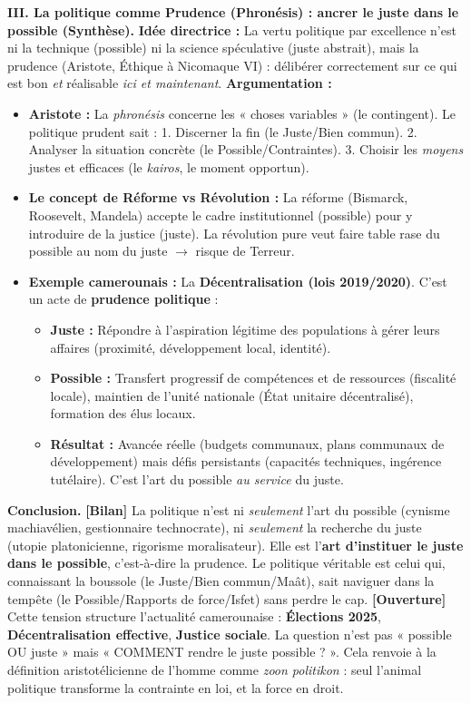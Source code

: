 \documentclass[11pt]{article}
\newcommand{\cle}[1]{{\popxbold\color{popdark}#1}}
\begin{document}
\begin{exoresolu}
\textbf{III. La politique comme Prudence (Phronésis) : ancrer le juste dans le possible (Synthèse).}
\textbf{Idée directrice :} La vertu politique par excellence n'est ni la technique (possible) ni la science spéculative (juste abstrait), mais la \cle{prudence} (Aristote, Éthique à Nicomaque VI) : délibérer correctement sur ce qui est bon \emph{et} réalisable \emph{ici et maintenant}.
\textbf{Argumentation :}
\begin{itemize}
    \item \textbf{Aristote :} La \emph{phronésis} concerne les « choses variables » (le contingent). Le politique prudent sait : 1. Discerner la fin (le Juste/Bien commun). 2. Analyser la situation concrète (le Possible/Contraintes). 3. Choisir les \emph{moyens} justes et efficaces (le \emph{kairos}, le moment opportun).
    \item \textbf{Le concept de \cle{Réforme} vs \cle{Révolution} :} La réforme (Bismarck, Roosevelt, Mandela) accepte le cadre institutionnel (possible) pour y introduire de la justice (juste). La révolution pure veut faire table rase du possible au nom du juste $\rightarrow$ risque de Terreur.
    \item \textbf{Exemple camerounais :} La \textbf{Décentralisation (lois 2019/2020)}. C'est un acte de \textbf{prudence politique} :
        \begin{itemize}
            \item \textbf{Juste :} Répondre à l'aspiration légitime des populations à gérer leurs affaires (proximité, développement local, identité).
            \item \textbf{Possible :} Transfert progressif de compétences et de ressources (fiscalité locale), maintien de l'unité nationale (État unitaire décentralisé), formation des élus locaux.
            \item \textbf{Résultat :} Avancée réelle (budgets communaux, plans communaux de développement) mais défis persistants (capacités techniques, ingérence tutélaire). C'est l'art du possible \emph{au service} du juste.
        \end{itemize}
\end{itemize}

\textbf{Conclusion.}
\textbf{[Bilan]} La politique n'est ni \emph{seulement} l'art du possible (cynisme machiavélien, gestionnaire technocrate), ni \emph{seulement} la recherche du juste (utopie platonicienne, rigorisme moralisateur). Elle est l'\textbf{art d'instituer le juste dans le possible}, c'est-à-dire la \cle{prudence}. Le politique véritable est celui qui, connaissant la boussole (le Juste/Bien commun/Maât), sait naviguer dans la tempête (le Possible/Rapports de force/Isfet) sans perdre le cap.
\textbf{[Ouverture]} Cette tension structure l'actualité camerounaise : \textbf{Élections 2025}, \textbf{Décentralisation effective}, \textbf{Justice sociale}. La question n'est pas « possible OU juste » mais « COMMENT rendre le juste possible ? ». Cela renvoie à la définition aristotélicienne de l'homme comme \emph{zoon politikon} : seul l'animal politique transforme la contrainte en loi, et la force en droit.
\end{exoresolu}
\end{document}
